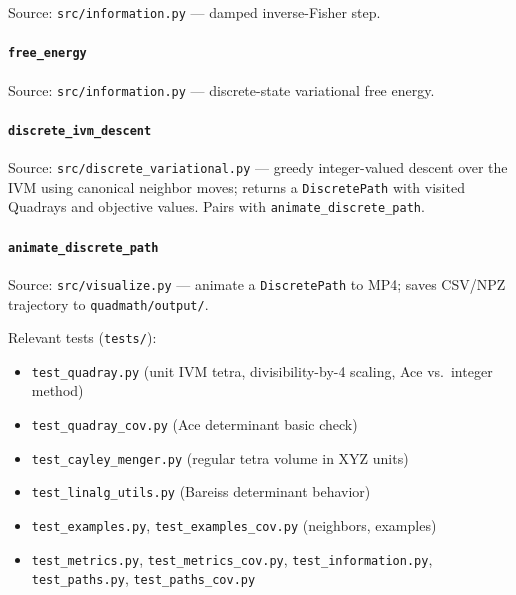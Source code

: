 \documentclass[
]{article}
\providecommand{\tightlist}{%
  \setlength{\itemsep}{0pt}\setlength{\parskip}{0pt}}
\begin{document}
Source: \texttt{src/information.py} --- damped inverse-Fisher step.

\hypertarget{code:free_energy}{%
\paragraph{\texorpdfstring{\texttt{free\_energy}}{free\_energy}}\label{code:free_energy}}

Source: \texttt{src/information.py} --- discrete-state variational free
energy.

\hypertarget{code:discrete_ivm_descent}{%
\paragraph{\texorpdfstring{\texttt{discrete\_ivm\_descent}}{discrete\_ivm\_descent}}\label{code:discrete_ivm_descent}}

Source: \texttt{src/discrete\_variational.py} --- greedy integer-valued
descent over the IVM using canonical neighbor moves; returns a
\texttt{DiscretePath} with visited Quadrays and objective values. Pairs
with \texttt{animate\_discrete\_path}.

\hypertarget{code:animate_discrete_path}{%
\paragraph{\texorpdfstring{\texttt{animate\_discrete\_path}}{animate\_discrete\_path}}\label{code:animate_discrete_path}}

Source: \texttt{src/visualize.py} --- animate a \texttt{DiscretePath} to
MP4; saves CSV/NPZ trajectory to \texttt{quadmath/output/}.

Relevant tests (\texttt{tests/}):

\begin{itemize}
\tightlist
\item
  \texttt{test\_quadray.py} (unit IVM tetra, divisibility-by-4 scaling,
  Ace vs.~integer method)
\item
  \texttt{test\_quadray\_cov.py} (Ace determinant basic check)
\item
  \texttt{test\_cayley\_menger.py} (regular tetra volume in XYZ units)
\item
  \texttt{test\_linalg\_utils.py} (Bareiss determinant behavior)
\item
  \texttt{test\_examples.py}, \texttt{test\_examples\_cov.py}
  (neighbors, examples)
\item
  \texttt{test\_metrics.py}, \texttt{test\_metrics\_cov.py},
  \texttt{test\_information.py}, \texttt{test\_paths.py},
  \texttt{test\_paths\_cov.py}
\end{itemize}
\end{document}
